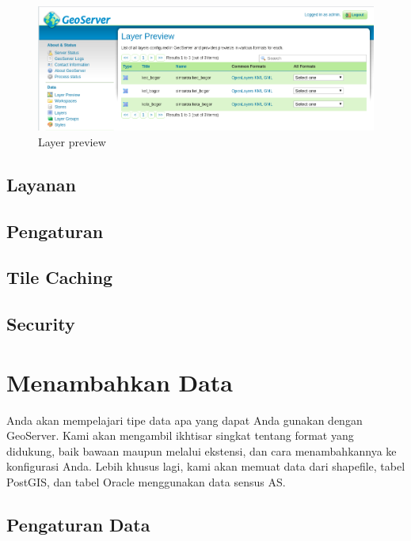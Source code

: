 \documentclass[]{book}
\begin{document}
\begin{figure}

{\centering \includegraphics[width=0.6\linewidth]{images/08/gs6} 

}

\caption{Layer preview}\label{fig:gs6}
\end{figure}

\hypertarget{layanan}{%
\subsection{Layanan}\label{layanan}}

\hypertarget{pengaturan}{%
\subsection{Pengaturan}\label{pengaturan}}

\hypertarget{tile-caching}{%
\subsection{Tile Caching}\label{tile-caching}}

\hypertarget{security}{%
\subsection{Security}\label{security}}

\hypertarget{menambahkan-data}{%
\section{Menambahkan Data}\label{menambahkan-data}}

Anda akan mempelajari tipe data apa yang dapat Anda gunakan dengan GeoServer. Kami akan mengambil ikhtisar singkat tentang format yang didukung, baik bawaan maupun melalui ekstensi, dan cara menambahkannya ke konfigurasi Anda. Lebih khusus lagi, kami akan memuat data dari shapefile, tabel PostGIS, dan tabel Oracle menggunakan data sensus AS.

\hypertarget{pengaturan-data}{%
\subsection{Pengaturan Data}\label{pengaturan-data}}
\end{document}
